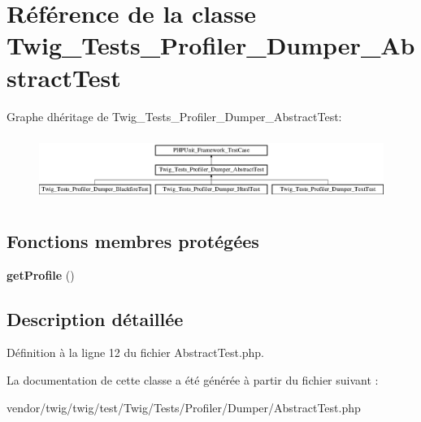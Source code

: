 \hypertarget{class_twig___tests___profiler___dumper___abstract_test}{}\section{Référence de la classe Twig\+\_\+\+Tests\+\_\+\+Profiler\+\_\+\+Dumper\+\_\+\+Abstract\+Test}
\label{class_twig___tests___profiler___dumper___abstract_test}
Graphe d\textquotesingle{}héritage de Twig\+\_\+\+Tests\+\_\+\+Profiler\+\_\+\+Dumper\+\_\+\+Abstract\+Test\+:\begin{figure}[H]
\begin{center}
\leavevmode
\includegraphics[height=2.137405cm]{class_twig___tests___profiler___dumper___abstract_test}
\end{center}
\end{figure}
\subsection*{Fonctions membres protégées}
\begin{DoxyCompactItemize}
\item 
{\bfseries get\+Profile} ()\hypertarget{class_twig___tests___profiler___dumper___abstract_test_abfc25ec9545bfee35877db62d8f87401}{}\label{class_twig___tests___profiler___dumper___abstract_test_abfc25ec9545bfee35877db62d8f87401}

\end{DoxyCompactItemize}


\subsection{Description détaillée}


Définition à la ligne 12 du fichier Abstract\+Test.\+php.



La documentation de cette classe a été générée à partir du fichier suivant \+:\begin{DoxyCompactItemize}
\item 
vendor/twig/twig/test/\+Twig/\+Tests/\+Profiler/\+Dumper/Abstract\+Test.\+php\end{DoxyCompactItemize}
